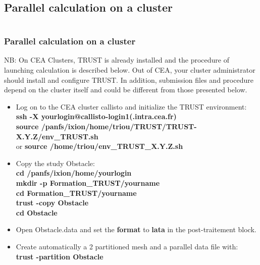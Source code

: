 \documentclass[10pt, hyperref={unicode=true,pdfusetitle, bookmarks=true,bookmarksnumbered=false,bookmarksopen=false, breaklinks=false,pdfborder={0 0 1},backref=true,colorlinks=true,linkcolor=darkblue,pageanchor}]{beamer}
\begin{document}
\subsection{Parallel calculation on a cluster} \label{exo_para_3}
\begin{frame}
\begin{columns}[c] 
\tableofcontents[sections={1-9},currentsection, currentsubsection]
\tableofcontents[sections={10-16},currentsection, currentsubsection]
\end{columns}
\end{frame}
\begin{frame}
\frametitle{Parallel calculation on a cluster}
\begin{block}{}
NB: On CEA Clusters, TRUST is already installed and the procedure of launching calculation is described below. Out of CEA, your cluster administrator should install and configure TRUST. In addition, submission files and procedure depend on the cluster itself and could be different from those presented below.
\begin{itemize}
\item Log on to the CEA cluster callisto and initialize the TRUST environment: \\
{\small{
\textbf{ssh -X yourlogin@callisto-login1(.intra.cea.fr)} \\
\textbf{source /panfs/ixion/home/triou/TRUST/TRUST-X.Y.Z/env\_TRUST.sh}\\
or 
\textbf{source /home/triou/env\_TRUST\_X.Y.Z.sh}\\
}}

\item Copy the study Obstacle:\\
\textbf{cd /panfs/ixion/home/yourlogin}\\
\textbf{mkdir  -p  Formation\_TRUST/yourname} \\
\textbf{cd Formation\_TRUST/yourname} \\
\textbf{trust -copy Obstacle} \\
\textbf{cd Obstacle} \\

\item Open Obstacle.data and set the \textbf{format} to \textbf{lata} in the post-traitement block.

\item Create automatically a 2 partitioned mesh and a parallel data file with:\\
\textbf{trust -partition Obstacle}

\end{itemize}

\end{block}
\end{frame}
\end{document}
